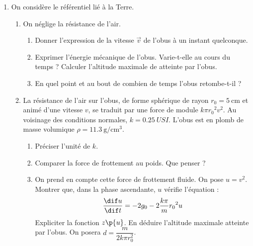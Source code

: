 \documentclass[a4paper,french,bookmarks]{article}
\begin{document}
    \begin{enumerate}
        \item On considère le référentiel lié à la Terre.
        
        \begin{enumerate}
            \item On néglige la résistance de l'air.

            \begin{enumerate}
                \item\label{qu:I.1.1.a} Donner l'expression de la vitesse
                $\vec v$ de l'obus à un instant quelconque.
                
                \item Exprimer l'énergie mécanique de l'obus. Varie-t-elle au
                cours du temps ? Calculer l'altitude maximale de atteinte par
                l'obus.
                
                \item En quel point et au bout de combien de temps l'obus retombe-t-il ?
            \end{enumerate}

            \item La résistance de l'air sur l'obus, de forme sphérique de
            rayon $r_0 = \qty{5}{\centi\metre}$ et animé d'une vitesse $v$, se
            traduit par une force de module $k\pi {r_0}^2 v^2$. Au voisinage
            des conditions normales, $k = \qty{0.25}{USI}$. L'obus est en plomb
            de masse volumique $\rho = \qty{11.3}{\g\per\centi\metre\cubed}$.

            \begin{enumerate}
                \item Préciser l'unité de $k$.
                
                \item Comparer la force de frottement au poids. Que penser ?
                
                \item On prend en compte cette force de frottement fluide. On
                pose $u=v^2$. Montrer que, dans la phase ascendante, $u$
                vérifie l'équation :
                \[
                    \dfrac{\dif u}{\dif t} = -2g_0 -2\dfrac{k\pi}{m}{r_0}^2u
                \]
                Expliciter la fonction $z\p{u}$. En déduire l'altitude
                maximale atteinte par l'obus. On posera $d = \dfrac{m}{2k\pi
                r_0^2}$.
            \end{enumerate}
        \end{enumerate}
    \end{enumerate}
\end{document}
